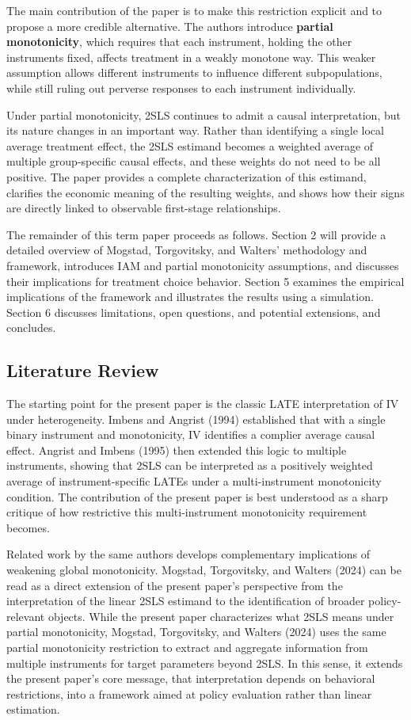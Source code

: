 \documentclass[
  12pt,
  a4paper,
  oneside]{article}
\begin{document}
The main contribution of the paper is to make this restriction explicit
and to propose a more credible alternative. The authors introduce
\textbf{partial
monotonicity}, which requires that each instrument, holding the other
instruments fixed, affects treatment in a weakly monotone way. This
weaker assumption allows different instruments to influence different
subpopulations, while still ruling out perverse responses to each
instrument individually.

Under partial monotonicity, 2SLS continues to admit a causal
interpretation, but its nature changes in an important way. Rather than
identifying a single local average treatment effect, the 2SLS estimand
becomes a weighted average of multiple group-specific causal effects,
and these weights do not need to be all positive. The paper provides a
complete characterization of this estimand, clarifies the economic
meaning of the resulting weights, and shows how their signs are directly
linked to observable first-stage relationships.

The remainder of this term paper proceeds as follows. Section 2 will
provide a detailed overview of Mogstad, Torgovitsky, and Walters'
methodology and framework, introduces IAM and partial monotonicity
assumptions, and discusses their implications for treatment choice
behavior. Section 5 examines the empirical implications of the framework
and illustrates the results using a simulation. Section 6 discusses
limitations, open questions, and potential extensions, and concludes.

\subsection{Literature Review}\label{literature-review}

The starting point for the present paper is the classic LATE
interpretation of IV under heterogeneity. Imbens and Angrist (1994)
established that with a single binary instrument and monotonicity, IV
identifies a complier average causal effect. Angrist and Imbens (1995)
then extended this logic to multiple instruments, showing that 2SLS can
be interpreted as a positively weighted average of instrument-specific
LATEs under a multi-instrument monotonicity condition. The contribution
of the present paper is best understood as a sharp critique of how
restrictive this multi-instrument monotonicity requirement becomes.

Related work by the same authors develops complementary implications of
weakening global monotonicity. Mogstad, Torgovitsky, and Walters (2024)
can be read as a direct extension of the present paper's perspective
from the interpretation of the linear 2SLS estimand to the
identification of broader policy-relevant objects. While the present
paper characterizes what 2SLS means under partial monotonicity, Mogstad,
Torgovitsky, and Walters (2024) uses the same partial monotonicity
restriction to extract and aggregate information from multiple
instruments for target parameters beyond 2SLS. In this sense, it extends
the present paper's core message, that interpretation depends on
behavioral restrictions, into a framework aimed at policy evaluation
rather than linear estimation.
\end{document}
